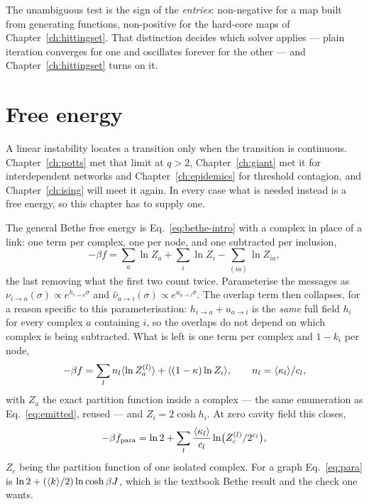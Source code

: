 The unambiguous test is the sign of the \emph{entries}: non-negative for a map
built from generating functions, non-positive for the hard-core maps of
Chapter~\ref{ch:hittingset}. That distinction decides which solver applies ---
plain iteration converges for one and oscillates forever for the other --- and
Chapter~\ref{ch:hittingset} turns on it.

\section{Free energy}
\label{sec:freeenergy}

A linear instability locates a transition only when the transition is
continuous. Chapter~\ref{ch:potts} met that limit at $q>2$,
Chapter~\ref{ch:giant} met it for interdependent networks and
Chapter~\ref{ch:epidemics} for threshold contagion, and
Chapter~\ref{ch:ising} will meet it again. In every case what is needed instead
is a free energy, so this chapter has to supply one.

The general Bethe free energy is Eq.~\eqref{eq:bethe-intro} with a complex in
place of a link: one term per complex, one per node, and one subtracted per
inclusion,
\[
  -\beta f=\sum_{a}\ln Z_{a}+\sum_{i}\ln Z_{i}
           -\sum_{(ia)}\ln Z_{ia},
\]
the last removing what the first two count twice. Parameterise the messages as
$\nu_{i\to a}(\sigma)\propto e^{h_{i\to a}\sigma}$ and
$\hat\nu_{a\to i}(\sigma)\propto e^{u_{a\to i}\sigma}$. The overlap term then
collapses, for a reason specific to this
parameterisation: $h_{i\to a}+u_{a\to i}$ is the \emph{same} full field $h_{i}$
for every complex $a$ containing $i$, so the overlaps do not depend on which
complex is being subtracted. What is left is one term per complex and $1-k_{i}$
per node,
\begin{equation}
  -\beta f=\sum_{l}n_{l}\langle \ln Z^{(l)}_{a} \rangle+\langle (1-\kappa)\ln Z_{i} \rangle,
  \qquad
  n_{l}=\langle \kappa_{l} \rangle/c_{l},
  \label{eq:bethe}
\end{equation}
with $Z_{a}$ the exact partition function inside a complex --- the same
enumeration as Eq.~\eqref{eq:emitted}, reused --- and $Z_{i}=2\cosh h_{i}$. At
zero cavity field this closes,
\begin{equation}
  -\beta f_{\mathrm{para}}=\ln2+\sum_{l}\frac{\langle \kappa_{l} \rangle}{c_{l}}
    \ln\bigl(Z^{(l)}_{c}/2^{c_{l}}\bigr),
  \label{eq:para}
\end{equation}
$Z_{c}$ being the partition function of one isolated complex. For a graph
Eq.~\eqref{eq:para} is $\ln2+(\langle k \rangle/2)\ln\cosh\beta J$, which is the textbook
Bethe result and the check one wants.

